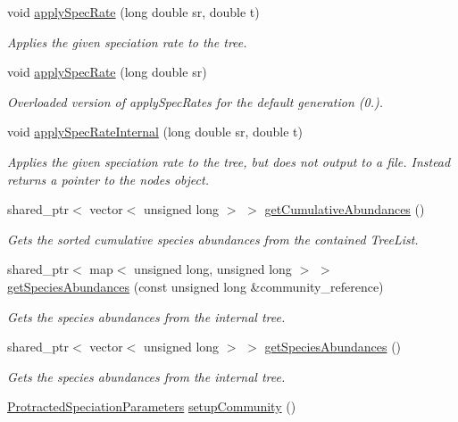 \begin{DoxyCompactItemize}
void \hyperlink{class_tree_aa6349a32b3fcfb82a5f8311b11db3982}{apply\+Spec\+Rate} (long double sr, double t)
\begin{DoxyCompactList}\small\item\em Applies the given speciation rate to the tree. \end{DoxyCompactList}\item 
void \hyperlink{class_tree_ab699328f13b22f48faa63a5638e907db}{apply\+Spec\+Rate} (long double sr)
\begin{DoxyCompactList}\small\item\em Overloaded version of apply\+Spec\+Rates for the default generation (0.). \end{DoxyCompactList}\item 
void \hyperlink{class_tree_ac89abe0404d05d0363258b72cb80700b}{apply\+Spec\+Rate\+Internal} (long double sr, double t)
\begin{DoxyCompactList}\small\item\em Applies the given speciation rate to the tree, but does not output to a file. Instead returns a pointer to the nodes object. \end{DoxyCompactList}\item 
shared\+\_\+ptr$<$ vector$<$ unsigned long $>$ $>$ \hyperlink{class_tree_ad84f38d8a8347b53c8fd77e0dc3e1f90}{get\+Cumulative\+Abundances} ()
\begin{DoxyCompactList}\small\item\em Gets the sorted cumulative species abundances from the contained Tree\+List. \end{DoxyCompactList}\item 
shared\+\_\+ptr$<$ map$<$ unsigned long, unsigned long $>$ $>$ \hyperlink{class_tree_a3dafbfba14cf2a12a24ddd2c90bfd3fc}{get\+Species\+Abundances} (const unsigned long \&community\+\_\+reference)
\begin{DoxyCompactList}\small\item\em Gets the species abundances from the internal tree. \end{DoxyCompactList}\item 
shared\+\_\+ptr$<$ vector$<$ unsigned long $>$ $>$ \hyperlink{class_tree_ac369b24b2b52b84b558220b9158806f8}{get\+Species\+Abundances} ()
\begin{DoxyCompactList}\small\item\em Gets the species abundances from the internal tree. \end{DoxyCompactList}\item 
\hyperlink{struct_protracted_speciation_parameters}{Protracted\+Speciation\+Parameters} \hyperlink{class_tree_ae39208e0f31a0170414a80e2b2d4e400}{setup\+Community} ()

\end{DoxyCompactItemize}
